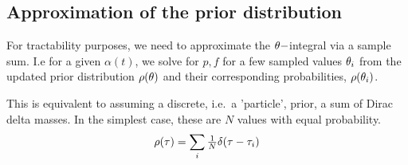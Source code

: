 \documentclass{article}
\begin{document}
\subsection{Approximation of the prior distribution}
For tractability purposes, we need to approximate the ${\theta}-$integral via a
sample sum. I.e for a given $\alpha(t)$, we solve for $p,f$ for a few sampled
values ${\theta}_i$ from the updated prior distribution $\rho({\theta})$ and their
corresponding probabilities, $\rho({\theta}_i)$.

This is equivalent to assuming a discrete, i.e.\ a 'particle', prior, a sum
of Dirac delta masses. In the simplest case, these are $N$ values with equal
probability.
\begin{equation}
\rho({ \tau }) = \sum_i  
	\tfrac 1N \delta({ \tau }- { \tau }_i) 
\label{eq:basic_prior_over_tau}
\end{equation} 
\end{document}

